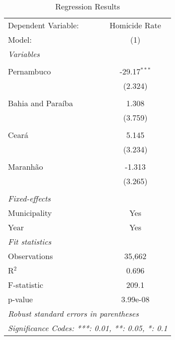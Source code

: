 \documentclass{article}
\begin{document}
\begin{table}[H]
   \caption{Regression Results}
   \centering
   \begin{tabular}{lc}
      \toprule \toprule
      Dependent Variable: & \multicolumn{1}{c}{Homicide Rate }\\
      Model:              & (1)\\  
      \midrule
      \emph{Variables}\\\\
      Pernambuco            & -29.17$^{***}$\\
                          & (2.324)\\\\
      Bahia and Paraíba        & 1.308\\
                          & (3.759)\\\\
      Ceará            & 5.145\\
                          & (3.234)\\\\
      Maranhão            & -1.313\\
                          & (3.265)\\\\
      \midrule
      \emph{Fixed-effects}\\
      Municipality        & Yes\\
      Year                & Yes\\
      \midrule
      \emph{Fit statistics}\\
      Observations        & 35,662\\
      R$^2$               & 0.696\\
      F-statistic         & 209.1\\
      p-value             & 3.99e-08\\
      \midrule \midrule
      \multicolumn{2}{l}{\emph{Robust standard errors in parentheses}}\\
      \multicolumn{2}{l}{\emph{Significance Codes: ***: 0.01, **: 0.05, *: 0.1}}\\
   \end{tabular}
\end{table}
\end{document}
